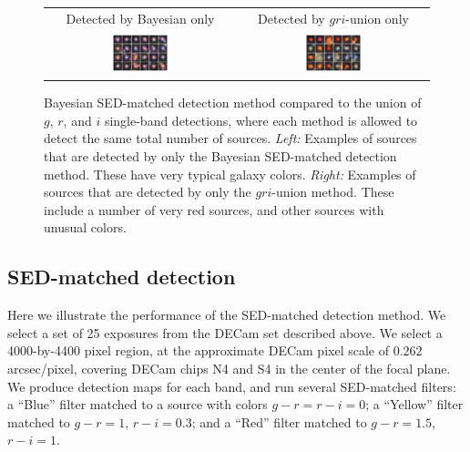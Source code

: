 \documentclass[11pt,letterpaper,linenumbers]{aastex63}
\begin{document}
\begin{figure}
  \begin{center}
    \begin{tabular}{cc}
      Detected by Bayesian only &
      Detected by $gri$-union only \\
      \includegraphics[width=0.3\textwidth]{bayes-only}
      &
      \includegraphics[width=0.3\textwidth]{gri-only}
    \end{tabular}
    \caption{Bayesian SED-matched detection method compared to the
      union of $g$, $r$, and $i$ single-band detections, where each
      method is allowed to detect the same total number of sources.
      \emph{Left:} Examples of sources that are detected by only the
      Bayesian SED-matched detection method.  These have very typical
      galaxy colors.  \emph{Right:}
      Examples of sources that are detected by only the $gri$-union
      method.  These include a number of very red sources, and other sources with
      unusual colors.
      \label{fig:only}}
  \end{center}
\end{figure}


\subsection{SED-matched detection}

Here we illustrate the performance of the SED-matched detection method.
We select a set of 25 exposures from the DECam set described above.
We select a 4000-by-4400 pixel region, at the approximate DECam pixel
scale of $0.262$ arcsec/pixel, covering DECam chips N4 and S4 in the
center of the focal plane.  We produce detection maps for each band,
and run several SED-matched filters: a ``Blue''
filter matched to a source with colors $g - r = r - i = 0$; a
``Yellow'' filter matched to $g - r = 1$, $r - i = 0.3$; and a ``Red''
filter matched to $g - r = 1.5$, $r - i = 1$.
\end{document}
